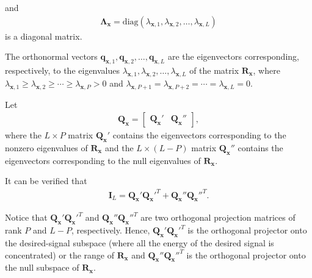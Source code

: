 \documentclass[10pt,pdflatex,headrule,landscape]{beamer}
\begin{document}
\begin{frame}[allowframebreaks]

and
\begin{eqnarray}
 \mathbf{\Lambda}_{\mathbf{x}} = \mathrm{diag} \left( \lambda_{\mathbf{x},1}, \lambda_{\mathbf{x},2}, \ldots, \lambda_{\mathbf{x},L} \right)
\end{eqnarray}
is a diagonal matrix.

The orthonormal vectors $\mathbf{q}_{\mathbf{x},1}, \mathbf{q}_{\mathbf{x},2}, \ldots, \mathbf{q}_{\mathbf{x},L}$ are the eigenvectors corresponding, respectively, to the eigenvalues $\lambda_{\mathbf{x},1}, \lambda_{\mathbf{x},2}, \ldots, \lambda_{\mathbf{x},L}$ of the matrix $\mathbf{R}_{\mathbf{x}}$, where $\lambda_{\mathbf{x},1} \geq
\lambda_{\mathbf{x},2} \geq \cdots \geq \lambda_{\mathbf{x},P} >0$ and $\lambda_{\mathbf{x},P+1} =
\lambda_{\mathbf{x},P+2} = \cdots = \lambda_{\mathbf{x},L}=0$.

Let
\begin{eqnarray}
 \mathbf{Q}_{\mathbf{x}} =
\left[ \begin{array}{cc} \mathbf{Q}_{\mathbf{x}}' & \mathbf{Q}_{\mathbf{x}}'' \end{array} \right],
\end{eqnarray}
where the $L \times P$ matrix $\mathbf{Q}_{\mathbf{x}}'$ contains the eigenvectors corresponding to the nonzero eigenvalues of $\mathbf{R}_{\mathbf{x}}$ and the $L \times (L-P)$ matrix $\mathbf{Q}_{\mathbf{x}}''$ contains the eigenvectors corresponding to the null eigenvalues of $\mathbf{R}_{\mathbf{x}}$.

It can be verified that
\begin{eqnarray}
\label{C2-orth-proj}
 \mathbf{I}_L = \mathbf{Q}_{\mathbf{x}}' \mathbf{Q}_{\mathbf{x}}'^T +
 \mathbf{Q}_{\mathbf{x}}'' \mathbf{Q}_{\mathbf{x}}''^T.
\end{eqnarray}

Notice that $\mathbf{Q}_{\mathbf{x}}'\mathbf{Q}_{\mathbf{x}}'^T$ and $\mathbf{Q}_{\mathbf{x}}'' \mathbf{Q}_{\mathbf{x}}''^T$ are two orthogonal projection matrices of rank $P$ and $L-P$, respectively. Hence, $\mathbf{Q}_{\mathbf{x}}' \mathbf{Q}_{\mathbf{x}}'^T$ is the orthogonal projector onto the desired-signal subspace (where all the energy of the desired signal is concentrated) or the range of $\mathbf{R}_{\mathbf{x}}$ and $\mathbf{Q}_{\mathbf{x}}'' \mathbf{Q}_{\mathbf{x}}''^T$ is the orthogonal projector onto the null subspace of $\mathbf{R}_{\mathbf{x}}$.


\end{frame}
\end{document}

